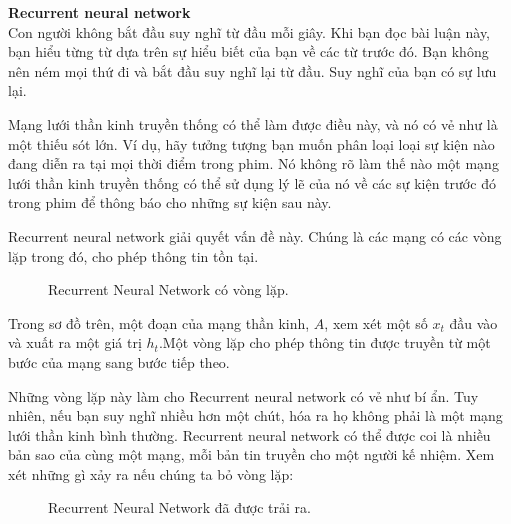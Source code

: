 \textbf{Recurrent neural network} \\[0.2em]
Con người không bắt đầu suy nghĩ từ đầu mỗi giây.
Khi bạn đọc bài luận này, bạn hiểu từng từ dựa trên sự hiểu biết của bạn về các từ trước đó.
Bạn không nên ném mọi thứ đi và bắt đầu suy nghĩ lại từ đầu. Suy nghĩ của bạn
có sự lưu lại.

Mạng lưới thần kinh truyền thống có thể làm được điều này, và nó có vẻ như là một
thiếu sót lớn.
Ví dụ, hãy tưởng tượng bạn muốn phân loại loại sự kiện nào đang diễn ra tại mọi thời điểm trong phim.
Nó không rõ làm thế nào một mạng lưới thần kinh truyền thống có thể sử dụng lý lẽ của nó về các sự kiện trước đó trong phim để thông báo cho những sự kiện sau này.

Recurrent neural network giải quyết vấn đề này. Chúng là các mạng có các vòng lặp trong đó, cho phép thông tin tồn tại.
\begin{figure}[!htb]
    \caption{\label{fig:rnn-rolled} Recurrent Neural Network có vòng lặp.}
\end{figure}

Trong sơ đồ trên, một đoạn của mạng thần kinh, \(A\), xem xét một số \(x_t\) đầu vào và xuất ra một giá trị
\(h_t\).Một vòng lặp cho phép thông tin được truyền từ một bước của mạng sang bước tiếp theo.

Những vòng lặp này làm cho Recurrent neural network có vẻ như bí ẩn.
Tuy nhiên, nếu bạn suy nghĩ nhiều hơn một chút, hóa ra họ không phải là một mạng lưới thần kinh bình thường.
Recurrent neural network có thể được coi là nhiều bản sao của cùng một mạng, mỗi bản tin truyền cho một người kế nhiệm.
Xem xét những gì xảy ra nếu chúng ta bỏ vòng lặp:

\begin{figure}[!htb]
    \caption{\label{fig:rnn-unrolled} Recurrent Neural Network đã được trải ra.}
\end{figure}


